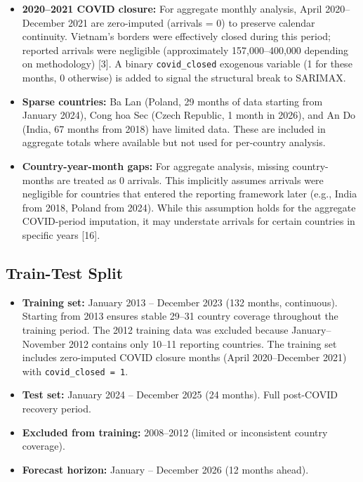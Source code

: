 \documentclass[
]{article}
\providecommand{\tightlist}{%
  \setlength{\itemsep}{0pt}\setlength{\parskip}{0pt}}
\begin{document}
\begin{itemize}
\tightlist
\item
  \textbf{2020--2021 COVID closure:} For aggregate monthly analysis,
  April 2020--December 2021 are zero-imputed (arrivals = 0) to preserve
  calendar continuity. Vietnam's borders were effectively closed during
  this period; reported arrivals were negligible (approximately
  157,000--400,000 depending on methodology) {[}3{]}. A binary
  \texttt{covid\_closed} exogenous variable (1 for these months, 0
  otherwise) is added to signal the structural break to SARIMAX.
\item
  \textbf{Sparse countries:} Ba Lan (Poland, 29 months of data starting
  from January 2024), Cong hoa Sec (Czech Republic, 1 month in 2026),
  and An Do (India, 67 months from 2018) have limited data. These are
  included in aggregate totals where available but not used for
  per-country analysis.
\item
  \textbf{Country-year-month gaps:} For aggregate analysis, missing
  country-months are treated as 0 arrivals. This implicitly assumes
  arrivals were negligible for countries that entered the reporting
  framework later (e.g., India from 2018, Poland from 2024). While this
  assumption holds for the aggregate COVID-period imputation, it may
  understate arrivals for certain countries in specific years {[}16{]}.
\end{itemize}

\subsection{Train-Test Split}\label{train-test-split}

\begin{itemize}
\tightlist
\item
  \textbf{Training set:} January 2013 -- December 2023 (132 months,
  continuous). Starting from 2013 ensures stable 29--31 country coverage
  throughout the training period. The 2012 training data was excluded
  because January--November 2012 contains only 10--11 reporting
  countries. The training set includes zero-imputed COVID closure months
  (April 2020--December 2021) with \texttt{covid\_closed\ =\ 1}.
\item
  \textbf{Test set:} January 2024 -- December 2025 (24 months). Full
  post-COVID recovery period.
\item
  \textbf{Excluded from training:} 2008--2012 (limited or inconsistent
  country coverage).
\item
  \textbf{Forecast horizon:} January -- December 2026 (12 months ahead).
\end{itemize}
\end{document}
